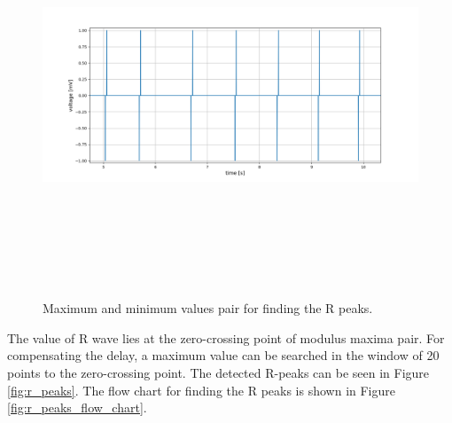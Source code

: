 \begin{figure}[htpb]
	\centering
	\includegraphics[width=15cm,height=12cm,keepaspectratio=true]{images/max_pair}
	\caption{
		Maximum and minimum values pair for finding the R peaks.
	}
	\label{fig:max_pair}
\end{figure}

The value of R wave lies at the zero-crossing point of modulus maxima pair. For compensating the delay, a maximum value can be searched in the window of 20 points to the zero-crossing point. The detected R-peaks can be seen in Figure \ref{fig:r_peaks}. The flow chart for finding the R peaks is shown in Figure \ref{fig:r_peaks_flow_chart}.

